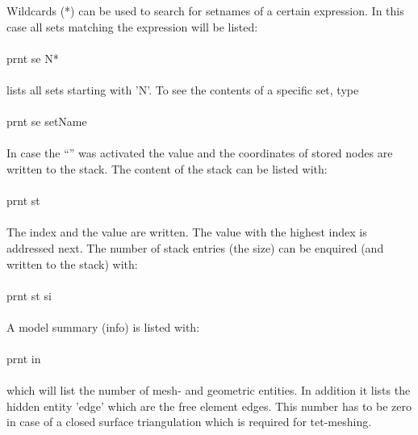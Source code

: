 \documentclass{article}
\begin{document}
Wildcards (*) can be used to search for setnames of a certain expression. In this case all sets matching the expression will be
listed:\\\\prnt se N*\\\\lists all sets starting with 'N'. To see the contents
of a specific set, type\\\\prnt se setName\\\\In case the
``'' was activated the value and the coordinates of
stored nodes are written to the stack. The content of the stack can be listed
with:\\\\prnt st\\\\The index and the value are written. The value with the
highest index is addressed next. The number of stack entries (the size) can be enquired (and written to the stack) with:\\\\prnt st si\\\\A model summary (info) is listed with:\\\\prnt in\\\\which will list the number of mesh- and geometric entities. In addition it lists the hidden entity 'edge' which are the free element edges. This number has to be zero in case of a closed surface triangulation which is required for tet-meshing.
\end{document}
